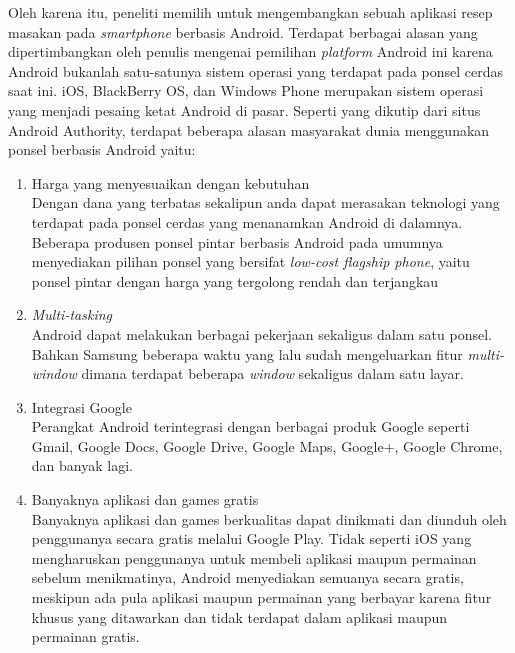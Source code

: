 Oleh karena itu, peneliti memilih untuk mengembangkan sebuah aplikasi resep masakan pada \textit{smartphone} berbasis Android. Terdapat berbagai alasan yang dipertimbangkan oleh penulis mengenai pemilihan \textit{platform} Android ini karena Android bukanlah satu-satunya sistem operasi yang terdapat pada ponsel cerdas saat ini. iOS, BlackBerry OS, dan Windows Phone merupakan sistem operasi yang menjadi pesaing ketat Android di pasar. Seperti yang dikutip dari situs Android Authority, terdapat beberapa alasan masyarakat dunia menggunakan ponsel berbasis Android yaitu:
\begin{enumerate}
	\item Harga yang menyesuaikan dengan kebutuhan\\
	Dengan dana yang terbatas sekalipun anda dapat merasakan teknologi yang terdapat pada ponsel cerdas yang menanamkan Android di dalamnya. Beberapa produsen ponsel pintar berbasis Android pada umumnya menyediakan pilihan ponsel yang bersifat \emph{low-cost flagship phone}, yaitu ponsel pintar dengan harga yang tergolong rendah dan terjangkau
	\item \emph{Multi-tasking}\\
	Android dapat melakukan berbagai pekerjaan sekaligus dalam satu ponsel. Bahkan Samsung beberapa waktu yang lalu sudah mengeluarkan fitur \emph{multi-window} dimana terdapat beberapa \emph{window} sekaligus dalam satu layar.
	\vspace{1cm}
	\item Integrasi Google\\
	Perangkat Android terintegrasi dengan berbagai produk Google seperti Gmail, Google Docs, Google Drive, Google Maps, Google+, Google Chrome, dan banyak lagi. 
	\item Banyaknya aplikasi dan games gratis\\
	Banyaknya aplikasi dan games berkualitas dapat dinikmati dan diunduh oleh penggunanya secara gratis melalui Google Play. Tidak seperti iOS yang mengharuskan penggunanya untuk  membeli aplikasi maupun permainan sebelum menikmatinya, Android menyediakan semuanya secara gratis, meskipun ada pula aplikasi maupun permainan yang berbayar karena fitur khusus yang ditawarkan dan tidak terdapat dalam aplikasi maupun permainan gratis.
\end{enumerate}

